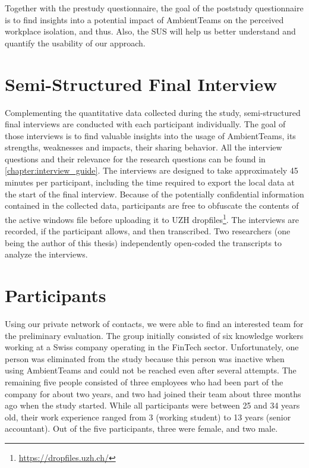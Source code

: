 Together with the prestudy questionnaire, the goal of the poststudy questionnaire is to find insights into a potential impact of AmbientTeams on the perceived workplace isolation, and thus. Also, the SUS will help us better understand and quantify the usability of our approach.

\section{Semi-Structured Final Interview}
\label{section:interview}
Complementing the quantitative data collected during the study, semi-structured final interviews are conducted with each participant individually. The goal of those interviews is to find valuable insights into the usage of AmbientTeams, its strengths, weaknesses and impacts, their sharing behavior. All the interview questions and their relevance for the research questions can be found in \autoref{chapter:interview_guide}. The interviews are designed to take approximately 45 minutes per participant, including the time required to export the local data at the start of the final interview. Because of the potentially confidential information contained in the collected data, participants are free to obfuscate the contents of the active windows file before uploading it to UZH dropfiles\footnote{\url{https://dropfiles.uzh.ch/}}. The interviews are recorded, if the participant allows, and then transcribed. Two researchers (one being the author of this thesis) independently open-coded the transcripts to analyze the interviews.

\section{Participants}
Using our private network of contacts, we were able to find an interested team for the preliminary evaluation. The group initially consisted of six knowledge workers working at a Swiss company operating in the FinTech sector. Unfortunately, one person was eliminated from the study because this person was inactive when using AmbientTeams and could not be reached even after several attempts. The remaining five people consisted of three employees who had been part of the company for about two years, and two had joined their team about three months ago when the study started. While all participants were between 25 and 34 years old, their work experience ranged from 3 (working student) to 13 years (senior accountant). Out of the five participants, three were female, and two male.